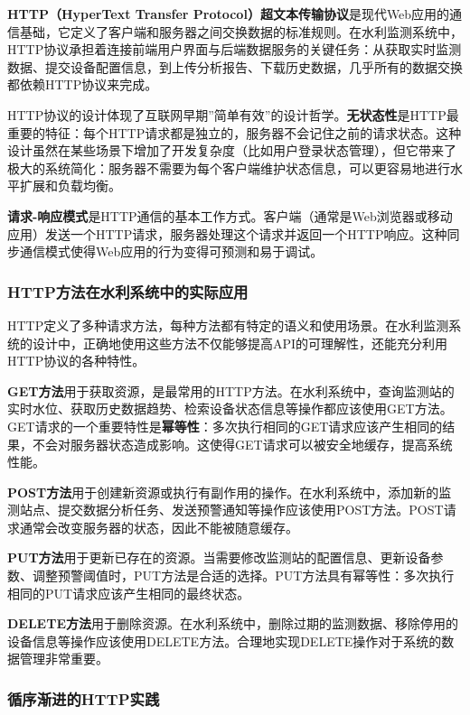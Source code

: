 \textbf{HTTP（HyperText Transfer Protocol）超文本传输协议}是现代Web应用的通信基础，它定义了客户端和服务器之间交换数据的标准规则。在水利监测系统中，HTTP协议承担着连接前端用户界面与后端数据服务的关键任务：从获取实时监测数据、提交设备配置信息，到上传分析报告、下载历史数据，几乎所有的数据交换都依赖HTTP协议来完成。

HTTP协议的设计体现了互联网早期''简单有效''的设计哲学。\textbf{无状态性}是HTTP最重要的特征：每个HTTP请求都是独立的，服务器不会记住之前的请求状态。这种设计虽然在某些场景下增加了开发复杂度（比如用户登录状态管理），但它带来了极大的系统简化：服务器不需要为每个客户端维护状态信息，可以更容易地进行水平扩展和负载均衡。

\textbf{请求-响应模式}是HTTP通信的基本工作方式。客户端（通常是Web浏览器或移动应用）发送一个HTTP请求，服务器处理这个请求并返回一个HTTP响应。这种同步通信模式使得Web应用的行为变得可预测和易于调试。

\subsubsection{HTTP方法在水利系统中的实际应用}\label{httpux65b9ux6cd5ux5728ux6c34ux5229ux7cfbux7edfux4e2dux7684ux5b9eux9645ux5e94ux7528}

HTTP定义了多种请求方法，每种方法都有特定的语义和使用场景。在水利监测系统的设计中，正确地使用这些方法不仅能够提高API的可理解性，还能充分利用HTTP协议的各种特性。

\textbf{GET方法}用于获取资源，是最常用的HTTP方法。在水利系统中，查询监测站的实时水位、获取历史数据趋势、检索设备状态信息等操作都应该使用GET方法。GET请求的一个重要特性是\textbf{幂等性}：多次执行相同的GET请求应该产生相同的结果，不会对服务器状态造成影响。这使得GET请求可以被安全地缓存，提高系统性能。

\textbf{POST方法}用于创建新资源或执行有副作用的操作。在水利系统中，添加新的监测站点、提交数据分析任务、发送预警通知等操作应该使用POST方法。POST请求通常会改变服务器的状态，因此不能被随意缓存。

\textbf{PUT方法}用于更新已存在的资源。当需要修改监测站的配置信息、更新设备参数、调整预警阈值时，PUT方法是合适的选择。PUT方法具有幂等性：多次执行相同的PUT请求应该产生相同的最终状态。

\textbf{DELETE方法}用于删除资源。在水利系统中，删除过期的监测数据、移除停用的设备信息等操作应该使用DELETE方法。合理地实现DELETE操作对于系统的数据管理非常重要。

\subsubsection{循序渐进的HTTP实践}\label{ux5faaux5e8fux6e10ux8fdbux7684httpux5b9eux8df5}

